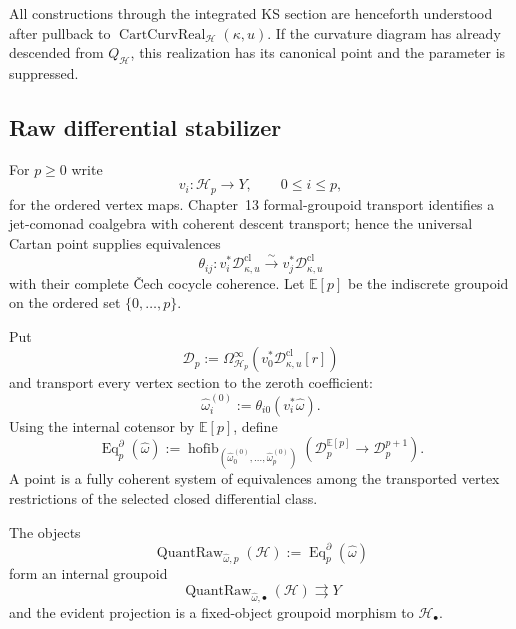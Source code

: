All constructions through the integrated KS section are henceforth understood
after pullback to $\operatorname{CartCurvReal}_{\mathcal H}(\kappa,u)$.  If the
curvature diagram has already descended from $Q_{\mathcal H}$, this realization
has its canonical point and the parameter is suppressed.

\subsection{Raw differential stabilizer}
\label{subsec:prequantum-raw-differential-stabilizer}

For $p\ge0$ write
\[
v_i:\mathcal H_p\longrightarrow Y,
\qquad 0\le i\le p,
\]
for the ordered vertex maps.  Chapter~13 formal-groupoid transport identifies a
jet-comonad coalgebra with coherent descent transport; hence the universal Cartan
point supplies equivalences
\[
\theta_{ij}:v_i^*\mathscr D^{\mathrm{cl}}_{\kappa,u}
\xrightarrow{\sim}
v_j^*\mathscr D^{\mathrm{cl}}_{\kappa,u}
\]
with their complete \v{C}ech cocycle coherence.  Let $\mathbb E[p]$ be the
indiscrete groupoid on the ordered set $\{0,\ldots,p\}$.

\begin{construction}
\label{constr:prequantum-coherent-equivalence-simplex}
Put
\[
\mathcal D_p
:=
\Omega_{\mathcal H_p}^\infty
(v_0^*\mathscr D^{\mathrm{cl}}_{\kappa,u}[r])
\]
and transport every vertex section to the zeroth coefficient:
\[
\widehat\omega_i^{(0)}
:=
\theta_{i0}(v_i^*\widehat\omega).
\]
Using the internal cotensor by $\mathbb E[p]$, define
\[
\boxed{
\operatorname{Eq}^{\partial}_p(\widehat\omega)
:=
\operatorname{hofib}_{(\widehat\omega_0^{(0)},\ldots,
                         \widehat\omega_p^{(0)})}
\left(
\mathcal D_p^{\mathbb E[p]}
\longrightarrow
\mathcal D_p^{p+1}
\right).
}
\]
A point is a fully coherent system of equivalences among the transported vertex
restrictions of the selected closed differential class.
\end{construction}

\begin{theorem}
\label{thm:prequantum-raw-differential-stabilizer-groupoid}
The objects
\[
\operatorname{QuantRaw}_{\widehat\omega,p}(\mathcal H)
:=
\operatorname{Eq}^{\partial}_p(\widehat\omega)
\]
form an internal groupoid
\[
\boxed{
\operatorname{QuantRaw}_{\widehat\omega,\bullet}(\mathcal H)
\rightrightarrows Y
}
\]
and the evident projection is a fixed-object groupoid morphism to
$\mathcal H_\bullet$.
\end{theorem}

